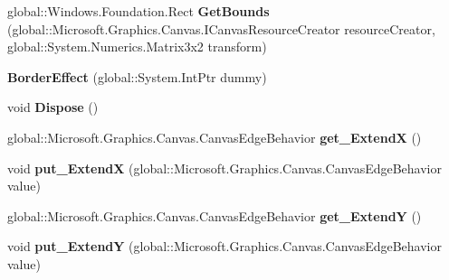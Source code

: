 \begin{DoxyCompactItemize}
\mbox{\label{class_microsoft_1_1_graphics_1_1_canvas_1_1_effects_1_1_border_effect_a71d105763b501f2e7bcdb69338ce699c}} 
global\+::\+Windows.\+Foundation.\+Rect {\bfseries Get\+Bounds} (global\+::\+Microsoft.\+Graphics.\+Canvas.\+I\+Canvas\+Resource\+Creator resource\+Creator, global\+::\+System.\+Numerics.\+Matrix3x2 transform)
\item 
\mbox{\label{class_microsoft_1_1_graphics_1_1_canvas_1_1_effects_1_1_border_effect_a2047b145d942967ddaf531f628fd6457}} 
{\bfseries Border\+Effect} (global\+::\+System.\+Int\+Ptr dummy)
\item 
\mbox{\label{class_microsoft_1_1_graphics_1_1_canvas_1_1_effects_1_1_border_effect_a8395460dd5965cd4aacc0875a1c0b680}} 
void {\bfseries Dispose} ()
\item 
\mbox{\label{class_microsoft_1_1_graphics_1_1_canvas_1_1_effects_1_1_border_effect_a9b8cb2410a4d2443829d9eeecfd0733e}} 
global\+::\+Microsoft.\+Graphics.\+Canvas.\+Canvas\+Edge\+Behavior {\bfseries get\+\_\+\+ExtendX} ()
\item 
\mbox{\label{class_microsoft_1_1_graphics_1_1_canvas_1_1_effects_1_1_border_effect_af4f6600839db25402d0fb39ed1fd5542}} 
void {\bfseries put\+\_\+\+ExtendX} (global\+::\+Microsoft.\+Graphics.\+Canvas.\+Canvas\+Edge\+Behavior value)
\item 
\mbox{\label{class_microsoft_1_1_graphics_1_1_canvas_1_1_effects_1_1_border_effect_aa62a4c26a2f87c325e90e8a2ef7348d0}} 
global\+::\+Microsoft.\+Graphics.\+Canvas.\+Canvas\+Edge\+Behavior {\bfseries get\+\_\+\+ExtendY} ()
\item 
\mbox{\label{class_microsoft_1_1_graphics_1_1_canvas_1_1_effects_1_1_border_effect_aaae1874ec7b1b2630d7636442f2c79c0}} 
void {\bfseries put\+\_\+\+ExtendY} (global\+::\+Microsoft.\+Graphics.\+Canvas.\+Canvas\+Edge\+Behavior value)

\end{DoxyCompactItemize}
